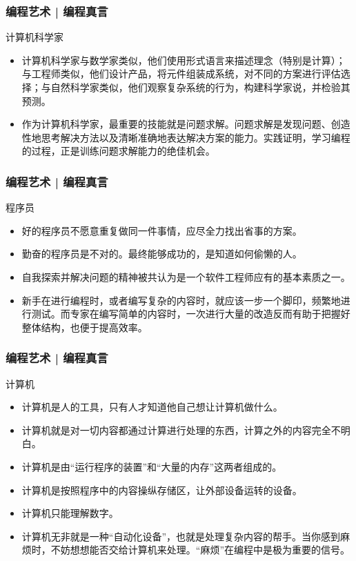 \begin{frame}
  \frametitle{编程艺术 | 编程真言}
  \begin{block}{计算机科学家}
    \begin{itemize}
      \item 计算机科学家与数学家类似，他们使用形式语言来描述理念（特别是计算）；与工程师类似，他们设计产品，将元件组装成系统，对不同的方案进行评估选择；与自然科学家类似，他们观察复杂系统的行为，构建科学家说，并检验其预测。
      \item 作为计算机科学家，最重要的技能就是\alert{问题求解}。问题求解是发现问题、创造性地思考解决方法以及清晰准确地表达解决方案的能力。实践证明，学习编程的过程，正是训练问题求解能力的绝佳机会。
    \end{itemize}
  \end{block}
\end{frame}

\begin{frame}
  \frametitle{编程艺术 | 编程真言}
  \begin{block}{程序员}
    \begin{itemize}
      \item 好的程序员不愿意重复做同一件事情，应尽全力找出省事的方案。
      \item 勤奋的程序员是不对的。最终能够成功的，是知道如何\alert{偷懒}的人。
      \item \alert{自我探索并解决问题的精神}被共认为是一个软件工程师应有的基本素质之一。 
      \item \alert{新手}在进行编程时，或者编写复杂的内容时，就应该一步一个脚印，频繁地进行测试。而\alert{专家}在编写简单的内容时，一次进行大量的改造反而有助于把握好整体结构，也便于提高效率。
    \end{itemize}
  \end{block}
\end{frame}

\begin{frame}
  \frametitle{编程艺术 | 编程真言}
  \begin{block}{计算机}
    \begin{itemize}
      \item 计算机是人的工具，只有人才知道他自己想让计算机做什么。
      \item 计算机就是对一切内容都通过计算进行处理的东西，计算之外的内容完全不明白。
      \item 计算机是由“运行程序的装置”和“大量的内存”这两者组成的。
      \item 计算机是按照程序中的内容操纵存储区，让外部设备运转的设备。
      \item 计算机只能理解数字。
      \item 计算机无非就是一种“\alert{自动化设备}”，也就是处理复杂内容的帮手。当你感到麻烦时，不妨想想能否交给计算机来处理。“麻烦”在编程中是极为重要的信号。
    \end{itemize}
  \end{block}
\end{frame}

